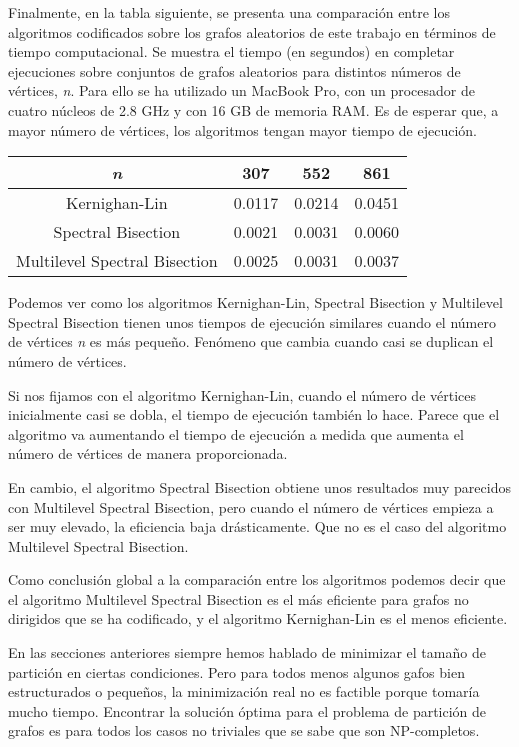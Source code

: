 Finalmente, en la tabla siguiente, se presenta una comparación entre los algoritmos codificados sobre los grafos aleatorios de este trabajo en términos de tiempo computacional. Se muestra el tiempo (en segundos) en completar ejecuciones sobre conjuntos de grafos aleatorios para distintos números de vértices, \textit{n}. Para ello se ha utilizado un MacBook Pro, con un procesador de cuatro núcleos de 2.8 GHz y con 16 GB de memoria RAM. Es de esperar que, a mayor número de vértices, los algoritmos tengan mayor tiempo de ejecución.

\begin{center}
	\begin{tabular}{|c|c|c|c|}
		\hline
		\textit{n} & 307 & 552 & 861 \\
		\hline
		Kernighan-Lin & 0.0117 & 0.0214 & 0.0451\\
		\hline
		Spectral Bisection & 0.0021 & 0.0031 & 0.0060 \\
		\hline
		Multilevel Spectral Bisection & 0.0025 & 0.0031 & 0.0037 \\ 
		\hline
	\end{tabular}
\end{center}

Podemos ver como los algoritmos Kernighan-Lin, Spectral Bisection y Multilevel Spectral Bisection tienen unos tiempos de ejecución similares cuando el número de vértices \textit{n} es más pequeño. Fenómeno que cambia cuando casi se duplican el número de vértices.

Si nos fijamos con el algoritmo Kernighan-Lin, cuando el número de vértices inicialmente casi se dobla, el tiempo de ejecución también lo hace. Parece que el algoritmo va aumentando el tiempo de ejecución a medida que aumenta el número de vértices de manera proporcionada.

En cambio, el algoritmo Spectral Bisection obtiene unos resultados muy parecidos con Multilevel Spectral Bisection, pero cuando el número de vértices empieza a ser muy elevado, la eficiencia baja drásticamente. Que no es el caso del algoritmo Multilevel Spectral Bisection.

Como conclusión global a la comparación entre los algoritmos podemos decir que el algoritmo Multilevel Spectral Bisection es el más eficiente para grafos no dirigidos que se ha codificado, y el algoritmo Kernighan-Lin es el menos eficiente.

En las secciones anteriores siempre hemos hablado de minimizar el tamaño de partición en ciertas condiciones. Pero para todos menos algunos gafos bien estructurados o pequeños, la minimización real no es factible porque tomaría mucho tiempo. Encontrar la solución óptima para el problema de partición de grafos es para todos los casos no triviales que se sabe que son NP-completos\cite{NPCompleteness}.

